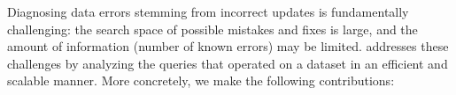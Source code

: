 Diagnosing data errors stemming from incorrect updates is fundamentally
challenging: the search space of possible mistakes and fixes is large, and the
amount of information (number of known errors) may be limited. 
\sys addresses these challenges by analyzing the queries that operated on a
dataset in an efficient and scalable manner. More concretely, we make the
following contributions:





